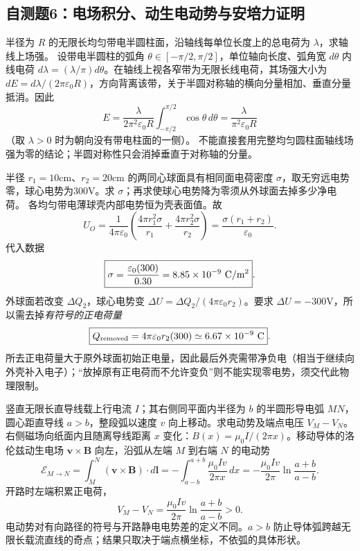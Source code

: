 \subsection{自测题6：电场积分、动生电动势与安培力证明}

\problemtext 半径为 $R$ 的无限长均匀带电半圆柱面，沿轴线每单位长度上的总电荷为 $\lambda$，求轴线上场强。
\workings 设带电半圆柱的弧角 $\theta\in[-\pi/2,\pi/2]$，单位轴向长度、弧角宽 $d\theta$ 内线电荷 $d\lambda=(\lambda/\pi)d\theta$。在轴线上视各窄带为无限长线电荷，其场强大小为 $dE=d\lambda/(2\pi\varepsilon_0 R)$，方向背离该带，关于半圆对称轴的横向分量相加、垂直分量抵消。因此
\[
E=\frac{\lambda}{2\pi^2\varepsilon_0R}
\int_{-\pi/2}^{\pi/2}\cos\theta\,d\theta
=\boxed{\frac{\lambda}{\pi^2\varepsilon_0R}}
\]
（取 $\lambda>0$ 时为朝向没有带电柱面的一侧）。
\crosscheck 不能直接套用完整均匀圆柱面轴线场强为零的结论；半圆对称性只会消掉垂直于对称轴的分量。

\problemtext 半径 $r_1=10$cm、$r_2=20$cm 的两同心球面具有相同面电荷密度 $\sigma$，取无穷远电势零，球心电势为300V。求 $\sigma$；再求使球心电势降为零须从外球面去掉多少净电荷。
\workings 各均匀带电薄球壳内部电势恒为壳表面值。故
\[
U_O=\frac{1}{4\pi\varepsilon_0}
\left(\frac{4\pi r_1^2\sigma}{r_1}+
\frac{4\pi r_2^2\sigma}{r_2}\right)
=\frac{\sigma(r_1+r_2)}{\varepsilon_0}.
\]
代入数据
\[\boxed{\sigma=\frac{\varepsilon_0(300)}{0.30}
=8.85\times10^{-9}\ {\rm C/m^2}}.\]
外球面若改变 $\Delta Q_2$，球心电势变 $\Delta U=\Delta Q_2/(4\pi\varepsilon_0r_2)$。要求 $\Delta U=-300$V，所以需去掉\emph{有符号的正电荷量}
\[
\boxed{Q_{\rm removed}=4\pi\varepsilon_0r_2(300)
\simeq6.67\times10^{-9}\ {\rm C}}.
\]
\crosscheck 所去正电荷量大于原外球面初始正电量，因此最后外壳需带净负电（相当于继续向外壳补入电子）；“放掉原有正电荷而不允许变负”则不能实现零电势，须交代此物理限制。

\problemtext 竖直无限长直导线载上行电流 $I$；其右侧同平面内半径为 $b$ 的半圆形导电弧 $MN$，圆心距直导线 $a>b$，整段弧以速度 $v$ 向上移动。求电动势及端点电压 $V_M-V_N$。
\workings 右侧磁场向纸面内且随离导线距离 $x$ 变化：$B(x)=\mu_0I/(2\pi x)$。移动导体的洛伦兹动生电场 $\bm v\times\bm B$ 向左，沿弧从左端 $M$ 到右端 $N$ 的电动势
\[
\mathcal E_{M\to N}=\int_M^N(\bm v\times\bm B)\cdot d\bm l
=-\int_{a-b}^{a+b}\frac{\mu_0Iv}{2\pi x}\,dx
=\boxed{-\frac{\mu_0Iv}{2\pi}\ln\frac{a+b}{a-b}}.
\]
开路时左端积累正电荷，
\[
\boxed{V_M-V_N=\frac{\mu_0Iv}{2\pi}\ln\frac{a+b}{a-b}>0}.
\]
\crosscheck 电动势对有向路径的符号与开路静电电势差的定义不同。$a>b$ 防止导体弧跨越无限长载流直线的奇点；结果只取决于端点横坐标，不依弧的具体形状。

